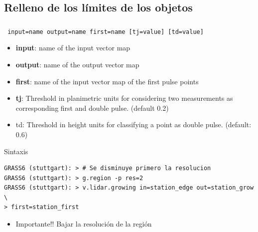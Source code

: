 \subsection{Relleno de los límites de los objetos}
\begin{frame}[fragile,shrink=10]
 \frametitle{}
\begin{beamerboxesrounded}[shadow=true]{\textbf{}\texttt{ input=name output=name first=name [tj=value] [td=value]}}
\begin{itemize}
 \item \textbf{input}: name of the input vector map
 \item \textbf{output}: name of the output vector map
 \item \textbf{first}: name of the input vector map of the first pulse points
 \item \textbf{tj}: Threshold in planimetric units for considering two measurements as corresponding first and double pulse. (default
0.2)
 \item td: Threshold in height units for classifying a point as double pulse. (default: 0.6)
\end{itemize}
\end{beamerboxesrounded}
\pause
\begin{beamerboxesrounded}[shadow=true]{Sintaxis}
\scriptsize
\begin{verbatim}
GRASS6 (stuttgart): > # Se disminuye primero la resolucion
GRASS6 (stuttgart): > g.region -p res=2
GRASS6 (stuttgart): > v.lidar.growing in=station_edge out=station_grow \
> first=station_first
\end{verbatim}
\end{beamerboxesrounded}
\begin{itemize}
 \item \alert{Importante!!} Bajar la resolución de la región
\end{itemize}
\end{frame}
\pgfdeclareimage[width=0.65\textwidth]{grow}{images/grow}

